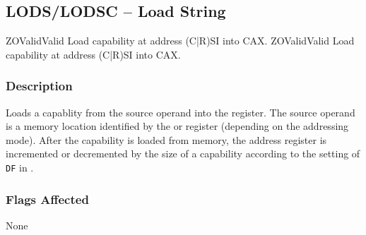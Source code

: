 \clearpage
{}
{}
\subsection*{LODS/LODSC -- Load String}

\begin{x86opcodetable}
  {ZO}{Valid}{Valid}
  {Load capability at address (C|R)SI into CAX.}
  {ZO}{Valid}{Valid}
  {Load capability at address (C|R)SI into CAX.}
\end{x86opcodetable}

\begin{x86opentable}
\end{x86opentable}

\subsubsection*{Description}

Loads a capablity from the source operand into the \CAX{} register.
The source operand is a memory location identified by the \RSI{} or
\CSI{} register (depending on the addressing mode).  After the
capability is loaded from memory, the address register is incremented
or decremented by the size of a capability according to the setting of
\texttt{DF} in \RFLAGS{}.

\subsubsection*{Flags Affected}

None
